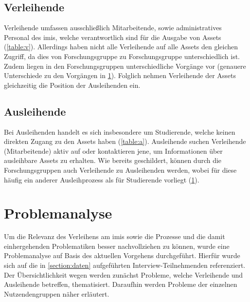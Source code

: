 \subsection{Verleihende}
Verleihende umfassen ausschließlich Mitarbeitende, sowie administratives Personal des \ac{imis},
welche verantwortlich sind für die Ausgabe von Assets (\ref{table:v}). Allerdings haben nicht alle
Verleihende auf alle Assets den gleichen Zugriff, da dies von Forschungsgruppe zu Forschungsgruppe
unterschiedlich ist. Zudem liegen in den Forschungsgruppen unterschiedliche Vorgänge vor (genauere
Unterschiede zu den Vorgängen in \ref{section:iststand}). Folglich nehmen Verleihende der Assets
gleichzeitig die Position der Ausleihenden ein.

\subsection{Ausleihende}
Bei Ausleihenden handelt es sich insbesondere um Studierende, welche keinen direkten Zugang zu den
Assets haben (\ref{table:a}). Ausleihende suchen Verleihende (Mitarbeitende) aktiv auf oder
kontaktieren jene, um Informationen über ausleihbare Assets zu erhalten. Wie bereits geschildert,
können durch die Forschungsgruppen auch Verleihende zu Ausleihenden werden, wobei für diese häufig
ein anderer Ausleihprozess als für Studierende vorliegt (\ref{section:iststand}).


\section{Problemanalyse}
\label{section:iststand}

Um die Relevanz des Verleihens am \ac{imis} sowie die Prozesse und die damit einhergehenden
Problematiken besser nachvollziehen zu können, wurde eine Problemanalyse auf Basis des aktuellen
Vorgehens durchgeführt. Hierfür wurde sich auf die in \ref{section:daten} aufgeführten
Interview-Teilnehmenden referenziert. Der Übersichtlichkeit wegen werden zunächst Probleme,
welche Verleihende und Ausleihende betreffen, thematisiert. Daraufhin werden Probleme der einzelnen
Nutzendengruppen näher erläutert.

